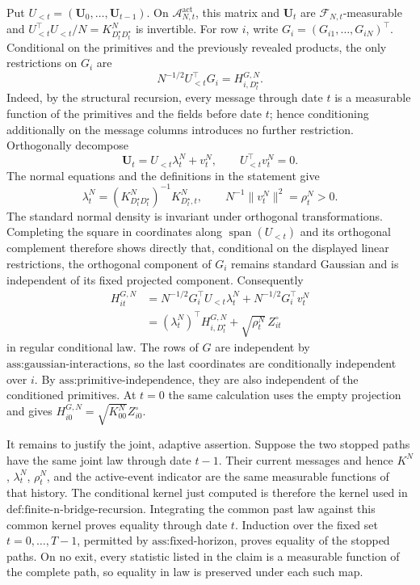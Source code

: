 Put \(U_{<t}=(\mathbf U_0,\ldots,\mathbf U_{t-1})\).  On \(\mathcal A_{N,t}^{\mathrm{act}}\), this matrix and \(\mathbf U_t\) are \(\mathscr F_{N,t}\)-measurable and \(U_{<t}^{\top}U_{<t}/N=K^N_{D_t^{\star}D_t^{\star}}\) is invertible.  For row \(i\), write \(G_i=(G_{i1},\ldots,G_{iN})^{\top}\).  Conditional on the primitives and the previously revealed products, the only restrictions on \(G_i\) are
\[
 N^{-1/2}U_{<t}^{\top}G_i=H^{G,N}_{i,D_t^{\star}}.
\]
Indeed, by the structural recursion, every message through date \(t\) is a measurable function of the primitives and the fields before date \(t\); hence conditioning additionally on the message columns introduces no further restriction.  Orthogonally decompose
\[
 \mathbf U_t=U_{<t}\lambda_t^N+v_t^N,
 \qquad U_{<t}^{\top}v_t^N=0.
\]
The normal equations and the definitions in the statement give
\[
 \lambda_t^N=(K^N_{D_t^{\star}D_t^{\star}})^{-1}K^N_{D_t^{\star},t},
 \qquad N^{-1}\|v_t^N\|^2=\rho_t^N>0.
\]
The standard normal density is invariant under orthogonal transformations.  Completing the square in coordinates along \(\operatorname{span}(U_{<t})\) and its orthogonal complement therefore shows directly that, conditional on the displayed linear restrictions, the orthogonal component of \(G_i\) remains standard Gaussian and is independent of its fixed projected component.  Consequently
\[
 \begin{aligned}
 H_{it}^{G,N}
 &=N^{-1/2}G_i^{\top}U_{<t}\lambda_t^N+N^{-1/2}G_i^{\top}v_t^N\\
 &=(\lambda_t^N)^{\top}H^{G,N}_{i,D_t^{\star}}+\sqrt{\rho_t^N}\,Z_{it}^{\circ}
 \end{aligned}
\]
in regular conditional law.  The rows of \(G\) are independent by \(\text{ass:gaussian-interactions}\), so the last coordinates are conditionally independent over \(i\).  By \(\text{ass:primitive-independence}\), they are also independent of the conditioned primitives.  At \(t=0\) the same calculation uses the empty projection and gives \(H_{i0}^{G,N}=\sqrt{K_{00}^N}Z_{i0}^{\circ}\).

It remains to justify the joint, adaptive assertion.  Suppose the two stopped paths have the same joint law through date \(t-1\).  Their current messages and hence \(K^N\), \(\lambda_t^N\), \(\rho_t^N\), and the active-event indicator are the same measurable functions of that history.  The conditional kernel just computed is therefore the kernel used in \(\text{def:finite-n-bridge-recursion}\).  Integrating the common past law against this common kernel proves equality through date \(t\).  Induction over the fixed set \(t=0,\ldots,T-1\), permitted by \(\text{ass:fixed-horizon}\), proves equality of the stopped paths.  On no exit, every statistic listed in the claim is a measurable function of the complete path, so equality in law is preserved under each such map.

